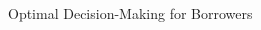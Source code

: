 \documentclass[11pt,aspectratio=43,usenames,dvipsnames]{beamer}
\theoremstyle{definition}
\begin{document}
\begin{frame}{Optimal Decision-Making for Borrowers}
\begin{columns}
\begin{column}{0.4\textwidth}
        \end{column}
        \begin{column}{0.6\textwidth}
            \begin{figure}
                \centering
            \end{figure}

        \end{column}
    \end{columns}


\end{frame}
\end{document}
